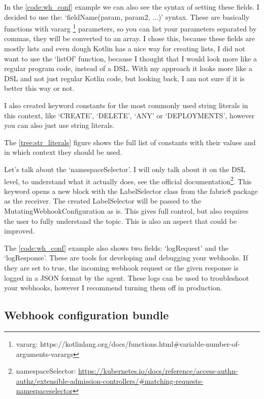 In the \ref{code:wh_conf} example we can also see the syntax of setting these fields. I decided to use the: `fieldName(param, param2, ...)' syntax. These are basically functions with vararg \footnote{vararg: https://kotlinlang.org/docs/functions.html\#variable-number-of-arguments-varargs} parameters, so you can list your parameters separated by commas, they will be converted to an array. I chose this, because these fields are mostly lists and even dough Kotlin has a nice way for creating lists, I did not want to use the `listOf' function, because I thought that I would look more like a regular program code, instead of a DSL. With my approach it looks more like a DSL and not just regular Kotlin code, but looking back, I am not sure if it is better this way or not.

I also created keyword constants for the most commonly used string literals in this context, like `CREATE', `DELETE', `ANY' or `DEPLOYMENTS', however you can also just use string literals.

The \ref{tree:str_literals} figure shows the full list of constants with their values and in which context they should be used.



Let's talk about the `namespaceSelector'. I will only talk about it on the DSL level, to understand what it actually does, see the official documentation\footnote{namespaceSelector: \url{https://kubernetes.io/docs/reference/access-authn-authz/extensible-admission-controllers/\#matching-requests-namespaceselector}}. 
This keyword opens a new block with the LabelSelector class from the fabric8 package as the receiver. The created LabelSelector will be passed to the MutatingWebhookConfiguration as is. This gives full control, but also requires the user to fully understand the topic. This is also an aspect that could be improved.

The \ref{code:wh_conf} example also shows two fields: `logRequest' and the `logResponse'. These are tools for developing and debugging your webhooks. If they are set to true, the incoming webhook request or the given response is logged in a JSON format by the agent. These logs can be used to troubleshoot your webhooks, however I recommend turning them off in production.

\subsection{Webhook configuration bundle}

